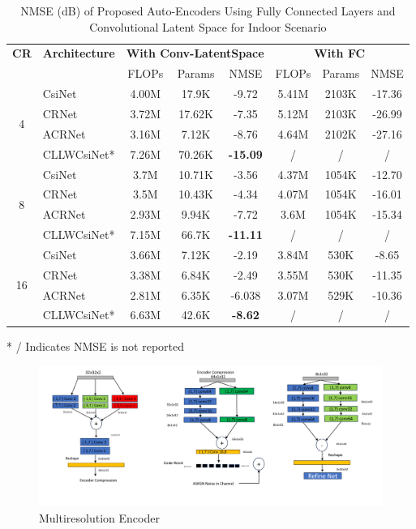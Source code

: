 \documentclass[lettersize,journal]{IEEEtran}
\begin{document}
\begin{table}[ht]
	\centering
	\caption{NMSE (dB) of Proposed Auto-Encoders Using Fully Connected Layers and Convolutional Latent Space for Indoor Scenario}
	\label{table:convlatenspacecomp}
	\begin{threeparttable}
		\begin{tabular}{clcccccc}
			\toprule
			\textbf{CR} & \textbf{Architecture} & \multicolumn{3}{c}{\textbf{With Conv-LatentSpace}} & \multicolumn{3}{c}{\textbf{With FC}} \\ 
			& & FLOPs & Params & NMSE & FLOPs & Params & NMSE \\ 
			\midrule
			\multirow{4}{*}{4} & CsiNet\cite{abe} & 4.00M & 17.9K & -9.72 & 5.41M & 2103K & -17.36 \\  
			& CRNet\cite{abn} & 3.72M & 17.62K & -7.35 & 5.12M & 2103K & -26.99 \\  
			& ACRNet\cite{abx} & 3.16M & 7.12K & -8.76 & 4.64M & 2102K & -27.16 \\
			& CLLWCsiNet* & 7.26M & 70.26K & \textbf{-15.09} & / & / & / \\ 
			\midrule
			\multirow{4}{*}{8} & CsiNet\cite{abe} & 3.7M & 10.71K & -3.56 & 4.37M & 1054K & -12.70 \\  
			& CRNet\cite{abn} & 3.5M & 10.43K & -4.34 & 4.07M & 1054K & -16.01 \\ 
			& ACRNet\cite{abx} & 2.93M & 9.94K & -7.72 & 3.6M & 1054K & -15.34 \\
			& CLLWCsiNet* & 7.15M & 66.7K & \textbf{-11.11} & / & / & / \\ 
			\midrule
			\multirow{4}{*}{16} & CsiNet\cite{abe} & 3.66M & 7.12K & -2.19 & 3.84M & 530K & -8.65 \\  
			& CRNet\cite{abn} & 3.38M & 6.84K & -2.49 & 3.55M & 530K & -11.35 \\ 
			& ACRNet\cite{abx} & 2.81M & 6.35K & -6.038 & 3.07M & 529K & -10.36 \\
			& CLLWCsiNet* & 6.63M & 42.6K & \textbf{-8.62} & / & / & / \\ 
			\bottomrule
		\end{tabular}
		\begin{tablenotes}[flushleft]
			\item[*] / Indicates NMSE is not reported
		\end{tablenotes}
	\end{threeparttable}
\end{table}


\begin{figure}[ht]
	\centering
	\includegraphics[width=0.6\linewidth]{Model_a.pdf}
	\caption{Multiresolution Encoder}
	\label{fig:figure1}
\end{figure}
\end{document}
